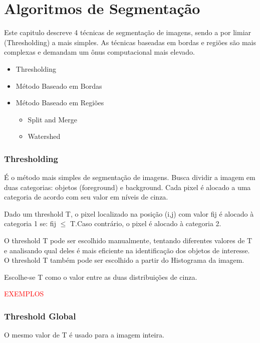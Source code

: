 \chapter{Algoritmos de Segmentação}\label{cap:algoritmos}

Este capitulo descreve 4 técnicas de segmentação de imagens, sendo a por limiar (Thresholding) a mais simples. As técnicas baseadas em bordas e regiões são mais complexas e demandam um ônus computacional mais elevado.

\begin{itemize}
    \item Thresholding
    \item Método Baseado em Bordas 
    \item Método Baseado em Regiões
    \begin{itemize}  
        \item Split and Merge
        \item Watershed
    \end{itemize}
\end{itemize}

\subsection{Thresholding}
É o método mais simples de segmentação de imagens.
Busca dividir a imagem em duas categorias: objetos (foreground) e background. 
Cada pixel é alocado a uma categoria de acordo com seu valor em níveis de cinza.

Dado um threshold T, o pixel localizado na posição (i,j) com valor fij é alocado à categoria 1 se: fij $\leq$ T.Caso contrário, o pixel é alocado à categoria 2.

O threshold T pode ser escolhido manualmente, tentando diferentes valores de T e analisando qual deles é mais eficiente na identificação dos objetos de interesse.
O threshold T também pode ser escolhido a partir do Histograma da imagem.

Escolhe-se T como o valor entre as duas distribuições de cinza.

\textcolor{red}{EXEMPLOS}

\subsection*{Threshold Global}
O mesmo valor de T é usado para a imagem inteira.

